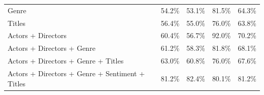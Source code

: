 \documentclass[
10pt, %
a4paper, %
oneside, %
headinclude,footinclude, %
] {book}%
\begin{document}
\begin{table}[hbtp]
\begin{tabular}{@{}lllll@{}}
Genre                             & 54.2\%         & 53.1\%          & 81.5\%       & 64.3\%         \\
Titles                            & 56.4\%         & 55.0\%          & 76.0\%       & 63.8\%         \\
Actors + Directors                        & 60.4\%         & 56.7\%          & 92.0\%       & 70.2\%         \\
Actors + Directors + Genre                        & 61.2\%         & 58.3\%          & 81.8\%       & 68.1\%         \\
Actors + Directors + Genre + Titles                       & 63.0\%         & 60.8\%          & 76.0\%       & 67.6\%         \\
Actors + Directors + Genre + Sentiment + Titles                    & 81.2\%         & 82.4\%          & 80.1\%       & 81.2\%         \\ \bottomrule
\end{tabular}
\end{table}
\end{document}
